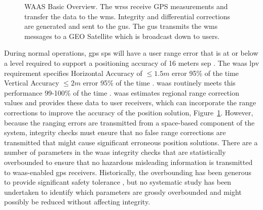 \begin{figure}
	\centering
	\caption{WAAS Basic Overview. The \acp{wrs} receive GPS measurements and transfer the data to the \ac{wms}. Integrity and differential corrections are generated and sent to the \ac{gus}.  The \ac{gus} transmits the \ac{wms} messages to a GEO Satellite which is broadcast down to users.
  }
	\label{fig:How-WAAS-Works}
\end{figure}

During normal operations, \ac{gps} \ac{sps} will have a user range error that is at or below a level required to support a positioning accuracy of 16 meters \ac{sep} \citep[p.51]{IS-GPS-200J}.  The \ac{waas} \ac{lpv} requirement specifies Horizontal Accuracy  of $\leq 1.5m$ error 95\% of the time Vertical Accuracy $\leq 2m$ error 95\% of the time \citep[p.4]{WAAS-PAN-66} \citep[p.34]{FAA-E-2892b}. \ac{waas} routinely meets this performance 99-100\% of the time \citep[p.29]{WAAS-PAN-66}. \ac{waas} estimates regional range correction values and provides these data to user receivers, which can incorporate the range corrections to improve the accuracy of the position solution, Figure~\ref{fig:How-WAAS-Works}. However, because the ranging errors are transmitted from a space-based component of the system, integrity checks must ensure that no false range corrections are transmitted that might cause significant erroneous position solutions.  There are a number of parameters in the \ac{waas} integrity checks that are statistically overbounded to ensure that no hazardous misleading information is transmitted to \ac{waas}-enabled \ac{gps} receivers.  Historically, the overbounding has been generous to provide significant safety tolerance \citep[p.61]{HMIDoc}, but no systematic study has been undertaken to identify which parameters are grossly overbounded and might possibly be reduced without affecting integrity.

